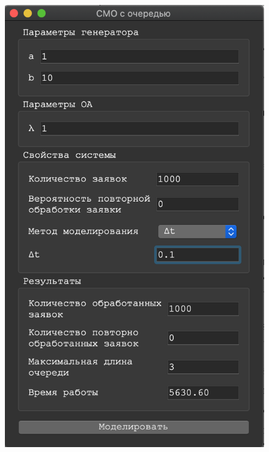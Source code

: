 \documentclass[a4paper,12pt]{article}
\begin{document}
\begin{figure}[h!]
\begin{minipage}[b]{0.32\textwidth}
			\includegraphics[width=\textwidth]{deltat_1_2.png}
		\end{minipage}
		\begin{minipage}[b]{0.32\textwidth}

\end{minipage}
\end{figure}
\end{document}
